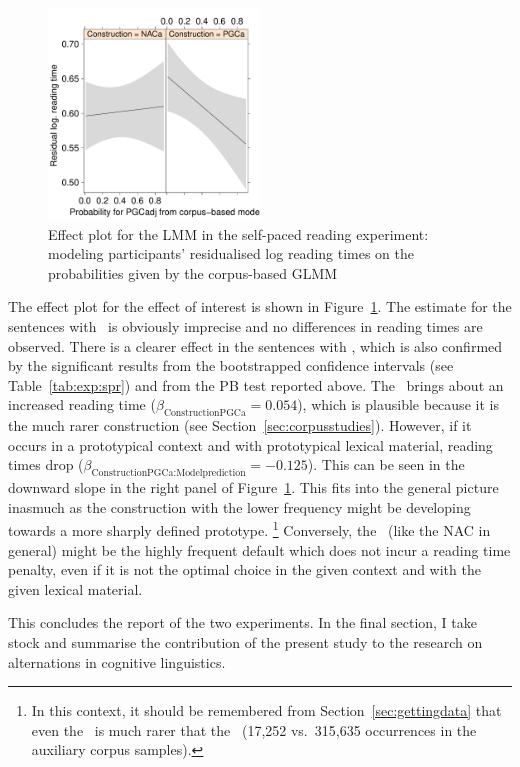 \begin{figure}[h]
\centering
\includegraphics[width=0.5\textwidth]{../R/output/spr_effects}
\caption{Effect plot for the LMM in the self-paced reading experiment: modeling participants' residualised log reading times on the probabilities given by the corpus-based GLMM}
\label{fig:spr:effects}
\end{figure}

The effect plot for the effect of interest is shown in Figure~\ref{fig:spr:effects}.
The estimate for the sentences with \NACa\ is obviously imprecise and no differences in reading times are observed.
There is a clearer effect in the sentences with \PGCa, which is also confirmed by the significant results from the bootstrapped confidence intervals (see Table~\ref{tab:exp:spr}) and from the PB test reported above.
The \PGCa\ brings about an increased reading time ($\beta_{\text{ConstructionPGCa}}=0.054$), which is plausible because it is the much rarer construction (see Section~\ref{sec:corpusstudies}).
However, if it occurs in a prototypical context and with prototypical lexical material, reading times drop ($\beta_{\text{ConstructionPGCa:Modelprediction}}=-0.125$).
This can be seen in the downward slope in the right panel of Figure~\ref{fig:spr:effects}.
This fits into the general picture inasmuch as the construction with the lower frequency might be developing towards a more sharply defined prototype.%
\footnote{In this context, it should be remembered from Section~\ref{sec:gettingdata} that even the \PGCd\ is much rarer that the \NACb\ (17,252 vs.\ 315,635 occurrences in the auxiliary corpus samples).}
Conversely, the \NACa\ (like the NAC in general) might be the highly frequent default which does not incur a reading time penalty, even if it is not the optimal choice in the given context and with the given lexical material.

This concludes the report of the two experiments.
In the final section, I take stock and summarise the contribution of the present study to the research on alternations in cognitive linguistics.




